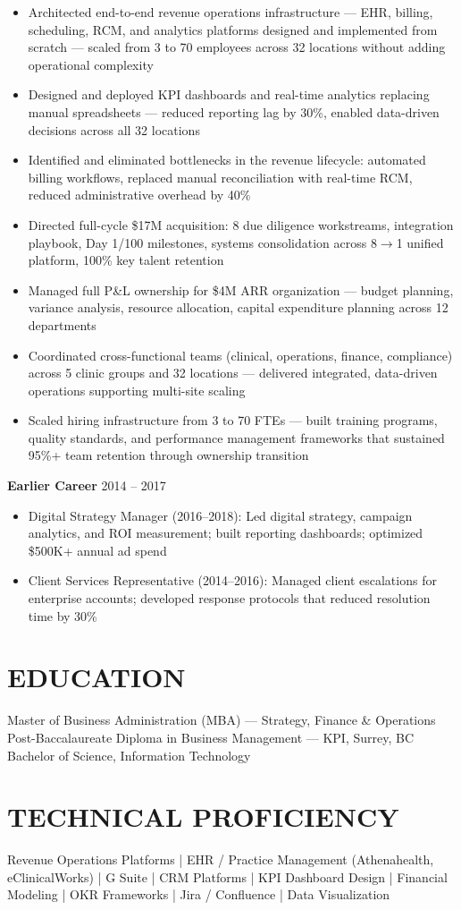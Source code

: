 \documentclass[10pt]{article}
\begin{document}
\begin{itemize}[noitemsep, leftmargin=0.25in]
\item Architected end-to-end revenue operations infrastructure --- EHR, billing, scheduling, RCM, and analytics platforms designed and implemented from scratch --- scaled from 3 to 70 employees across 32 locations without adding operational complexity
\item Designed and deployed KPI dashboards and real-time analytics replacing manual spreadsheets --- reduced reporting lag by 30\%, enabled data-driven decisions across all 32 locations
\item Identified and eliminated bottlenecks in the revenue lifecycle: automated billing workflows, replaced manual reconciliation with real-time RCM, reduced administrative overhead by 40\%
\item Directed full-cycle \$17M acquisition: 8 due diligence workstreams, integration playbook, Day 1/100 milestones, systems consolidation across 8$\rightarrow$1 unified platform, 100\% key talent retention
\item Managed full P\&L ownership for \$4M ARR organization --- budget planning, variance analysis, resource allocation, capital expenditure planning across 12 departments
\item Coordinated cross-functional teams (clinical, operations, finance, compliance) across 5 clinic groups and 32 locations --- delivered integrated, data-driven operations supporting multi-site scaling
\item Scaled hiring infrastructure from 3 to 70 FTEs --- built training programs, quality standards, and performance management frameworks that sustained 95\%+ team retention through ownership transition
\end{itemize}

\textbf{Earlier Career}  \hfill  2014 -- 2017
\begin{itemize}[noitemsep, leftmargin=0.25in]
\item Digital Strategy Manager (2016--2018): Led digital strategy, campaign analytics, and ROI measurement; built reporting dashboards; optimized \$500K+ annual ad spend
\item Client Services Representative (2014--2016): Managed client escalations for enterprise accounts; developed response protocols that reduced resolution time by 30\%
\end{itemize}

\section*{EDUCATION}
Master of Business Administration (MBA) --- Strategy, Finance \& Operations \\
Post-Baccalaureate Diploma in Business Management --- KPI, Surrey, BC \\
Bachelor of Science, Information Technology

\section*{TECHNICAL PROFICIENCY}
Revenue Operations Platforms  |  EHR / Practice Management (Athenahealth, eClinicalWorks)  |
G Suite  |  CRM Platforms  |  KPI Dashboard Design  |  Financial Modeling  |
OKR Frameworks  |  Jira / Confluence  |  Data Visualization
\end{document}
